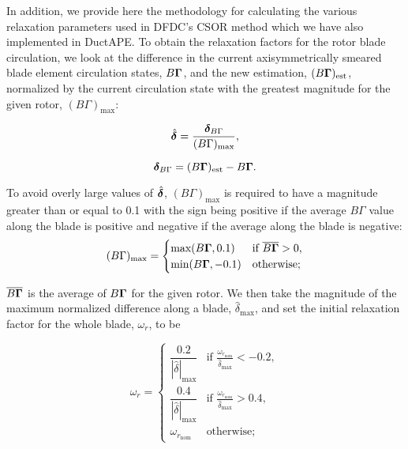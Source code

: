 In addition, we provide here the methodology for calculating the various relaxation parameters used in DFDC's CSOR method which we have also implemented in DuctAPE.
%
To obtain the relaxation factors for the rotor blade circulation, we look at the difference in the current axisymmetrically smeared blade element circulation states,
\(B\bm{\Gamma}\), and the new estimation,
\((B\bm{\Gamma})_\text{est}\), normalized by the current circulation state with the greatest magnitude for the given rotor, \((B\Gamma)_\text{max}\):

\begin{equation}
   \hat{\bm{\delta}} = \frac{\bm{\delta}_{B\Gamma}}{(B\Gamma)_\text{max}},
\end{equation}

\where

\begin{equation}
   \bm{\delta}_{B\Gamma} = (B\bm{\Gamma})_\text{est} - B\bm{\Gamma}.
\end{equation}

\noindent To avoid overly large values of \(\hat{\bm{\delta}}\), \((B\Gamma)_\text{max}\) is required to have a magnitude greater than or equal to 0.1 with the sign being positive if the average \(B\Gamma\) value along the blade is positive and negative if the average along the blade is negative:
%
\begin{equation}
   (B\Gamma)_\text{max} =
   \begin{cases}
       \text{max}(B\bm{\Gamma},0.1) & \text{if } \overline{B\bm{\Gamma}} > 0, \\
       \text{min}(B\bm{\Gamma},-0.1) & \text{otherwise};
   \end{cases}
\end{equation}

\where \(\overline{B\bm{\Gamma}}\) is the average of \(B\bm{\Gamma}\) for the given rotor.
%
We then take the magnitude of the maximum normalized difference along a blade, \(\hat{\delta}_\text{max}\), and set the initial relaxation factor for the whole blade, \(\omega_r\), to be

\begin{equation}
   \omega_r =
   \begin{cases}
       \dfrac{0.2}{|\hat{\delta}|_\text{max}} & \text{if } \frac{\omega_{r_\text{nom}}}{\hat{\delta}_\text{max}} < -0.2,
       \\[10pt]
       \dfrac{0.4}{|\hat{\delta}|_\text{max}} & \text{if } \frac{\omega_{r_\text{nom}}}{\hat{\delta}_\text{max}} > 0.4, \\[10pt]
       \omega_{r_\text{nom}} & \text{otherwise};
   \end{cases}
\end{equation}

